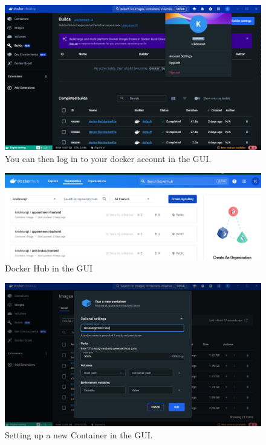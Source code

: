 \documentclass[11pt]{article}
\begin{document}
\begin{figure}[H]
    \centering
    \includegraphics[width=.95\textwidth]{docker logged in.png}
    \caption{You can then log in to your docker account in the GUI.}
\end{figure}

\begin{figure}[H]
    \centering
    \includegraphics[width=.95\textwidth]{docker hub.png}
    \caption{Docker Hub in the GUI}
\end{figure}

\begin{figure}[H]
    \centering
    \includegraphics[width=.95\textwidth]{creating a container.png}
    \caption{Setting up a new Container in the GUI.}
\end{figure}
\end{document}
